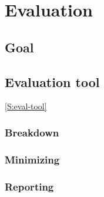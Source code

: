 \chapter{Evaluation}\label{C:eval}
%

\section{Goal}

\section{Evaluation tool}\ref{S:eval-tool}

\subsection{Breakdown}

\subsection{Minimizing}

\subsection{Reporting}


